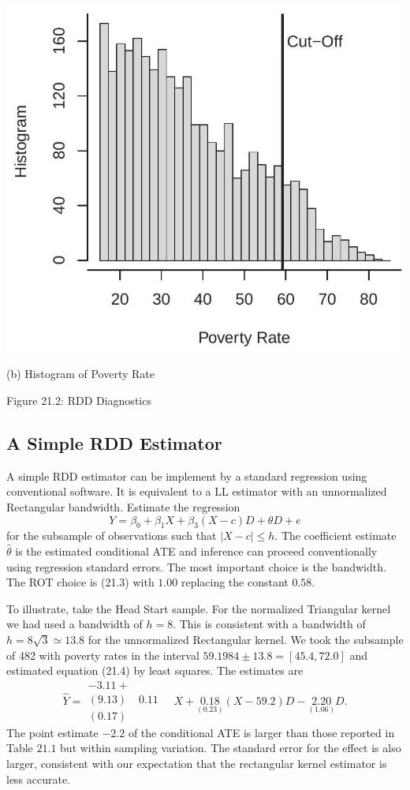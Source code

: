 \documentclass[10pt]{article}
\begin{document}
\includegraphics[max width=\textwidth]{2022_10_23_bb8a8d8a5dc56cf142a9g-09(1)}

(b) Histogram of Poverty Rate

Figure 21.2: RDD Diagnostics

\subsection{A Simple RDD Estimator}
A simple RDD estimator can be implement by a standard regression using conventional software. It is equivalent to a LL estimator with an unnormalized Rectangular bandwidth. Estimate the regression
$$
Y=\beta_{0}+\beta_{1} X+\beta_{3}(X-c) D+\theta D+e
$$
for the subsample of observations such that $|X-c| \leq h$. The coefficient estimate $\widehat{\theta}$ is the estimated conditional ATE and inference can proceed conventionally using regression standard errors. The most important choice is the bandwidth. The ROT choice is (21.3) with $1.00$ replacing the constant $0.58$.

To illustrate, take the Head Start sample. For the normalized Triangular kernel we had used a bandwidth of $h=8$. This is consistent with a bandwidth of $h=8 \sqrt{3} \simeq 13.8$ for the unnormalized Rectangular kernel. We took the subsample of 482 with poverty rates in the interval $59.1984 \pm 13.8=[45.4,72.0]$ and estimated equation (21.4) by least squares. The estimates are
$$
\widehat{Y}=\begin{array}{cc}
-3.11+ \\
(9.13) & 0.11 \\
(0.17)
\end{array} \quad X+\underset{(0.23)}{0.18}(X-59.2) D-\underset{(1.06)}{2.20} D .
$$
The point estimate $-2.2$ of the conditional ATE is larger than those reported in Table $21.1$ but within sampling variation. The standard error for the effect is also larger, consistent with our expectation that the rectangular kernel estimator is less accurate.
\end{document}
